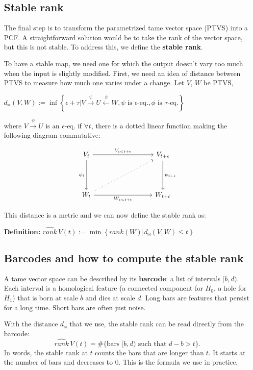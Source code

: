 \documentclass[11pt,a4paper]{article}
\begin{document}
\subsection{Stable rank}
The final step is to transform the parametrized tame vector space (PTVS) into a PCF. A straightforward solution would be to take the rank of the vector space, but this is not stable. To address this, we define the \textbf{stable rank}.

To have a stable map, we need one for which the output doesn't vary too much when the input is slightly modified. First, we need an idea of distance between PTVS to measure how much one varies under a change. Let $V$, $W$ be PTVS,

$d_{\bowtie}(V,W) := \inf \left\{ \epsilon + \tau | V \xrightarrow\psi U \xleftarrow\phi W, \psi \text{ is }\epsilon\text{-eq.}, \phi \text{ is }\tau\text{-eq.} \right\}$

where $V \xrightarrow\psi U$ is an $\epsilon\text{-eq.}$ if $\forall t$,  there is a dotted linear function making the
following diagram commutative:

\[
\begin{tikzcd}[column sep=3cm, row sep=1.5cm]
V_t
    \arrow[r, "V_{t<t+\epsilon}"]
    \arrow[d, "\psi_t"']
&
V_{t+\epsilon}
    \arrow[d, "\psi_{t+\epsilon}"]
\\
W_t
    \arrow[r, "W_{t<t+\epsilon}"']
    \arrow[ur, dotted]
&
W_{t+\epsilon}
\end{tikzcd}
\]

This distance is a metric and we can now define the stable rank as:

\textbf{Definition:}
$\widehat{rank}\,V(t) := \min\left\{ rank(W) | d_{\bowtie}(V,W)\leq t \right\}$

\subsection{Barcodes and how to compute the stable rank}
\label{sec:barcode}
A tame vector space can be described by its \textbf{barcode}: a list of intervals $[b,d)$. Each interval is a homological feature (a connected component for $H_0$, a hole for $H_1$) that is born at scale $b$ and dies at scale $d$. Long bars are features that persist for a long time. Short bars are often just noise.

With the distance $d_{\bowtie}$ that we use, the stable rank can be read directly from the barcode:
\[
    \widehat{rank}\,V(t) = \#\{\text{bars } [b,d) \text{ such that } d-b > t\}.
\]
In words, the stable rank at $t$ counts the bars that are longer than $t$. It starts at the number of bars and decreases to 0. This is the formula we use in practice.
\end{document}
